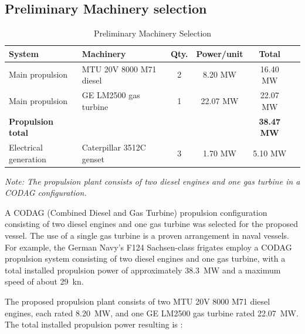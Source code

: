 \documentclass[12pt,a4paper,twoside]{report}
\begin{document}
\subsection{Preliminary Machinery selection}
\begin{table}[htbp]
    \centering
    \caption{Preliminary Machinery Selection}
    \label{tab:preliminary_machinery_selection}

    \footnotesize
    \setlength{\tabcolsep}{5pt}

    \begin{tabular}{llcccc}
        \toprule
        \textbf{System} &
        \textbf{Machinery} &
        \textbf{Qty.} &
        \textbf{Power/unit} &
        \textbf{Total} \\
        \midrule

        Main propulsion &
        MTU 20V 8000 M71 diesel \cite{mtu_20v8000_m71} &
        2 &
        8.20 MW &
        16.40 MW \\

        Main propulsion &
        GE LM2500 gas turbine \cite{ge_lm2500} &
        1 &
        22.07 MW &
        22.07 MW \\

        \textbf{Propulsion total} &
        &
        &
        &
        \textbf{38.47 MW} \\

        Electrical generation &
        Caterpillar 3512C genset \cite{caterpillar_3512c} &
        3 &
        1.70 MW &
        5.10 MW \\

        \bottomrule
    \end{tabular}

    \vspace{2mm}
    \footnotesize
    \textit{Note: The propulsion plant consists of two diesel engines and one gas turbine in a CODAG configuration.}
\end{table}
\noindent A CODAG (Combined Diesel and Gas Turbine) propulsion configuration
consisting of two diesel engines and one gas turbine was selected for
the proposed vessel. The use of a single gas turbine is a proven
arrangement in naval vessels. For example, the German Navy's
F124 Sachsen-class frigates
\cite{f124_sachsen_bundeswehr,ge_marine_frigate_propulsion}
employ a CODAG propulsion system consisting of two diesel engines
and one gas turbine, with a total installed propulsion power of
approximately 38.3~MW and a maximum speed of about 29~kn.

\vspace{\baselineskip}\par\noindent The proposed propulsion plant consists of two MTU 20V 8000 M71
diesel engines, each rated 8.20~MW, and one GE LM2500 gas turbine
rated 22.07~MW. The total installed propulsion power resulting is :
\end{document}
